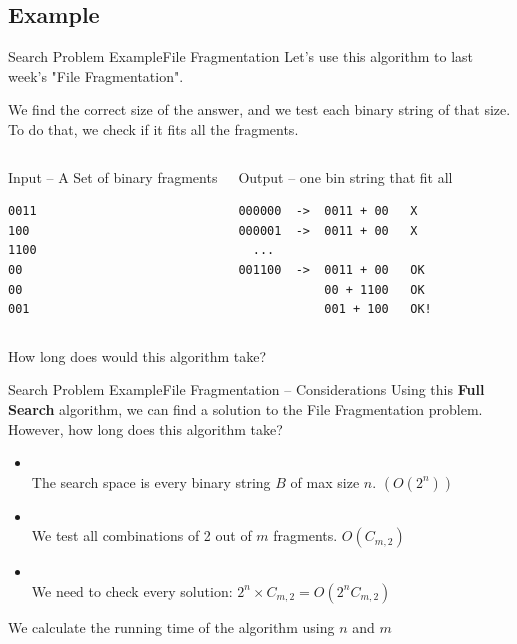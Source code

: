\subsection{Example}
\begin{frame}[fragile]{Search Problem Example}{File Fragmentation}
  Let's use this algorithm to last week's "File Fragmentation".\medskip

  We find the correct size of the answer, and we test each binary string
  of that size.\\
  To do that, we check if it fits all the fragments.

  \begin{columns}[T]
  \begin{block}{Input -- A Set of binary fragments}
\begin{verbatim}
0011
100
1100
00
00
001
\end{verbatim}
  \end{block}
  \begin{exampleblock}{Output -- one bin string that fit all}
\begin{verbatim}
000000  ->  0011 + 00   X
000001  ->  0011 + 00   X
  ...
001100  ->  0011 + 00   OK
            00 + 1100   OK
            001 + 100   OK!
\end{verbatim}
  \end{exampleblock}
\end{columns}\bigskip

  How long does would this algorithm take?
\end{frame}

\begin{frame}{Search Problem Example}{File Fragmentation -- Considerations}
  Using this {\bf Full Search} algorithm, we can find a solution to the File Fragmentation problem. However, how long does this algorithm take?\medskip

  \begin{itemize}
  \item {}\\
    The search space is every binary string $B$ of max size $n$. $(O(2^n))$
    \bigskip

  \item {}\\
    We test all combinations of 2 out of $m$ fragments. $O(C_{m,2})$
    \bigskip

  \item {}\\
    We need to check every solution: $2^n \times C_{m,2} =  O(2^nC_{m,2})$
  \end{itemize}
  \bigskip

  We calculate the running time of the algorithm using $n$ and $m$
\end{frame}

